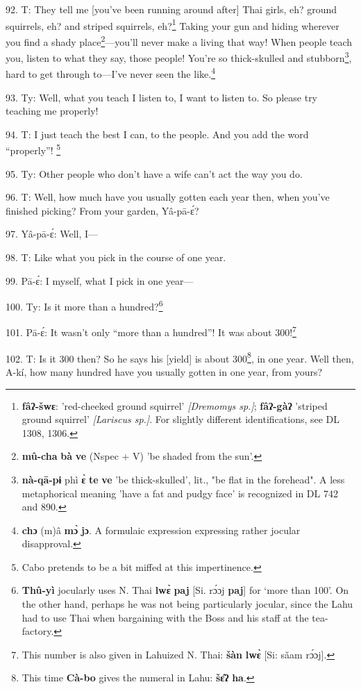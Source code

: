 92. T: They tell me [you've been running around after] Thai girls, eh? ground
squirrels, eh? and striped squirrels, eh?\footnote{\textbf{fâʔ-šwɛ}: 'red-cheeked ground squirrel' \textit{[Dremomys sp.]}; \textbf{fâʔ-gàʔ} 'striped ground squirrel' \textit{[Lariscus sp.]}. For slightly different identifications, see DL 1308, 1306.} Taking your gun and hiding wherever
you find a shady place\footnote{\textbf{mû-cha} \textbf{bà} \textbf{ve} (Nspec + V) 'be shaded from the sun'.}---you'll never make a living that way! When people
teach you, listen to what they say, those people! You're so thick-skulled and
stubborn\footnote{\textbf{nà-qā-pɨ} phì \textbf{ɛ̀} \textbf{te} \textbf{ve} 'be thick-skulled', lit., "be flat in the forehead". A less metaphorical meaning 'have a fat and pudgy face' is recognized in DL 742 and 890.}, hard to get through to---I've never seen the like.\footnote{\textbf{chɔ} (m)â \textbf{mɔ̀} \textbf{jɔ}. A formulaic expression expressing rather jocular disapproval.}

93. Ty: Well, what you teach I listen to, I want to listen to. So please try
teaching me properly!

94. T: I just teach the best I can, to the people. And you add the word ``properly''!
\footnote{Cabo pretends to be a bit miffed at this impertinence.}

95. Ty: Other people who don't have a wife can't act the way you do.

96. T: Well, how much have you usually gotten each year then, when you've finished
picking? From your garden, Yâ-pā-ɛ́?

97. Yâ-pā-ɛ́: Well, I---

98. T: Like what you pick in the course of one year.

99. Pā-ɛ́: I myself, what I pick in one year---

100. Ty: Is it more than a hundred?\footnote{\textbf{Thû-yì} jocularly uses N. Thai \textbf{lwɛ̀} \textbf{paj} [Si. rɔ́ɔj \textbf{paj}] for `more than 100'. On the other hand, perhaps he was not being particularly jocular, since the Lahu had to use Thai when bargaining with the Boss and his staff at the tea-factory.}

101. Pā-ɛ́: It wasn't only ``more than a hundred''! It was about 300!\footnote{This number is also given in Lahuized N. Thai: \textbf{šàn} \textbf{lwɛ̀} [Si: sǎam rɔ́ɔj].}

102. T: Is it 300 then? So he says his [yield] is about 300\footnote{This time \textbf{Cà-bo} gives the numeral in Lahu: \textbf{šɛ̂ʔ} \textbf{ha}.}, in one year.
Well then, A-kí, how many hundred have you usually gotten in one year, from yours?

